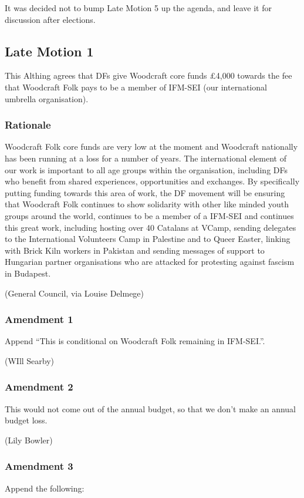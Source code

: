 \documentclass[a4paper, 11pt]{article} %
\begin{document}
It was decided not to bump Late Motion 5 up the agenda, and leave it for discussion after elections.

\subsection{Late Motion 1}
\label{motion:late1}
This Althing agrees that DFs give Woodcraft core funds £4,000
towards the fee that Woodcraft Folk pays to be a member of IFM-SEI (our
international umbrella organisation).

\subsubsection{Rationale}
Woodcraft Folk core funds are very low at the moment and
Woodcraft nationally has been running at a loss for a number of years.
The international element of our work is important to all age groups
within the organisation, including DFs who benefit from shared
experiences, opportunities and exchanges. By specifically putting
funding towards this area of work, the DF movement will be ensuring that
Woodcraft Folk continues to show solidarity with other like minded youth
groups around the world, continues to be a member of a IFM-SEI and
continues this great work, including hosting over 40 Catalans at VCamp,
sending delegates to the International Volunteers Camp in Palestine and
to Queer Easter, linking with Brick Kiln workers in Pakistan and sending
messages of support to Hungarian partner organisations who are attacked
for protesting against fascism in Budapest.

(General Council, via Louise Delmege)

\subsubsection{Amendment 1}

Append ``This is conditional on Woodcraft Folk remaining in IFM-SEI.''.

(WIll Searby)

\subsubsection{Amendment 2}

This would not come out of the annual budget, so that we don't make an annual budget loss.

(Lily Bowler)

\subsubsection{Amendment 3}
Append the following:
\end{document}
